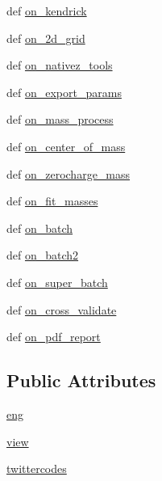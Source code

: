 \begin{DoxyCompactItemize}
\item 
def \hyperlink{class_uni_dec_1_1_g_uni_dec_1_1_uni_dec_app_a9284f7596232672b76267694c0b2d3e5}{on\+\_\+kendrick}
\item 
def \hyperlink{class_uni_dec_1_1_g_uni_dec_1_1_uni_dec_app_a74bf8b884fa6a7b94c52b65ac8eef98b}{on\+\_\+2d\+\_\+grid}
\item 
def \hyperlink{class_uni_dec_1_1_g_uni_dec_1_1_uni_dec_app_a028e786c7a6c462a94d86fe3a3920eaf}{on\+\_\+nativez\+\_\+tools}
\item 
def \hyperlink{class_uni_dec_1_1_g_uni_dec_1_1_uni_dec_app_a7887226a98047864c7686ed8c1de3c27}{on\+\_\+export\+\_\+params}
\item 
def \hyperlink{class_uni_dec_1_1_g_uni_dec_1_1_uni_dec_app_ad35c06df6a8321d28ea5c4747b79f07f}{on\+\_\+mass\+\_\+process}
\item 
def \hyperlink{class_uni_dec_1_1_g_uni_dec_1_1_uni_dec_app_a8faf5c547d48d2b1174b7d254b20720a}{on\+\_\+center\+\_\+of\+\_\+mass}
\item 
def \hyperlink{class_uni_dec_1_1_g_uni_dec_1_1_uni_dec_app_a6682b98bc5de5ee5b8a12e69a6039f7f}{on\+\_\+zerocharge\+\_\+mass}
\item 
def \hyperlink{class_uni_dec_1_1_g_uni_dec_1_1_uni_dec_app_ae7786790702270b0a6d3c89d966558f8}{on\+\_\+fit\+\_\+masses}
\item 
def \hyperlink{class_uni_dec_1_1_g_uni_dec_1_1_uni_dec_app_a628cf3842ec5ada6f5b60e5ea68c66b8}{on\+\_\+batch}
\item 
def \hyperlink{class_uni_dec_1_1_g_uni_dec_1_1_uni_dec_app_a1bfc387d15073c8dd2ff45c1ceb5fbaa}{on\+\_\+batch2}
\item 
def \hyperlink{class_uni_dec_1_1_g_uni_dec_1_1_uni_dec_app_a325dc08343153dfae4d945fb402fe2dd}{on\+\_\+super\+\_\+batch}
\item 
def \hyperlink{class_uni_dec_1_1_g_uni_dec_1_1_uni_dec_app_a34927e6b9052b8176a3f4d7fa77306d8}{on\+\_\+cross\+\_\+validate}
\item 
def \hyperlink{class_uni_dec_1_1_g_uni_dec_1_1_uni_dec_app_a30e994f3ae83494e6bf7d0d58f1fbf7b}{on\+\_\+pdf\+\_\+report}
\end{DoxyCompactItemize}
\subsection*{Public Attributes}
\begin{DoxyCompactItemize}
\item 
\hyperlink{class_uni_dec_1_1_g_uni_dec_1_1_uni_dec_app_a1f220c87c58eab43b0d4311165e26028}{eng}
\item 
\hyperlink{class_uni_dec_1_1_g_uni_dec_1_1_uni_dec_app_afcd9db1e30556b34ac144e339e799df3}{view}
\item 
\hyperlink{class_uni_dec_1_1_g_uni_dec_1_1_uni_dec_app_a0a18efbbf3628fb0ddec272376aca130}{twittercodes}
\end{DoxyCompactItemize}


